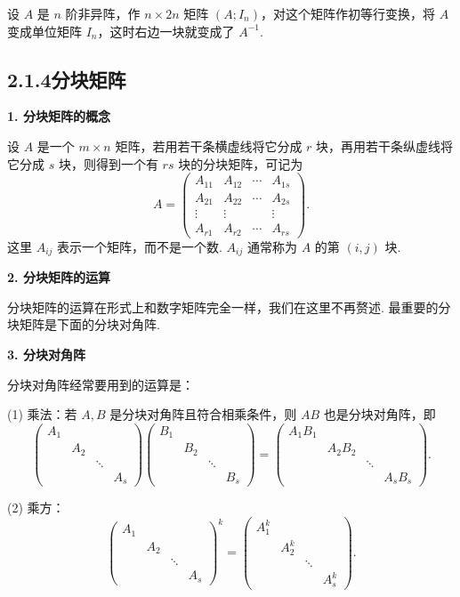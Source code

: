 \documentclass[UTF8, 12pt, fontset=fandol, oneside]{ctexart}
\begin{document}
设 $A$ 是 $n$ 阶非异阵，作 $n\times 2n$ 矩阵 $(A;I_n)$，对这个矩阵作初等行变换，将 $A$ 变成单位矩阵 $I_n$，这时右边一块就变成了 $A^{-1}$.

\subsection*{2.1.4\quad 分块矩阵}

\noindent\textbf{1. 分块矩阵的概念}

设 $A$ 是一个 $m\times n$ 矩阵，若用若干条横虚线将它分成 $r$ 块，再用若干条纵虚线将它分成 $s$ 块，则得到一个有 $rs$ 块的分块矩阵，可记为
\[
A=
\left(
\begin{array}{cccc}
A_{11} & A_{12} & \cdots & A_{1s}\\
A_{21} & A_{22} & \cdots & A_{2s}\\
\vdots & \vdots & & \vdots\\
A_{r1} & A_{r2} & \cdots & A_{rs}
\end{array}
\right).
\]
这里 $A_{ij}$ 表示一个矩阵，而不是一个数. $A_{ij}$ 通常称为 $A$ 的第 $(i,j)$ 块.

\noindent\textbf{2. 分块矩阵的运算}

分块矩阵的运算在形式上和数字矩阵完全一样，我们在这里不再赘述. 最重要的分块矩阵是下面的分块对角阵.

\noindent\textbf{3. 分块对角阵}

分块对角阵经常要用到的运算是：

(1) 乘法：若 $A,B$ 是分块对角阵且符合相乘条件，则 $AB$ 也是分块对角阵，即
\[
\left(
\begin{array}{cccc}
A_1 & & &\\
& A_2 & &\\
& & \ddots &\\
& & & A_s
\end{array}
\right)
\left(
\begin{array}{cccc}
B_1 & & &\\
& B_2 & &\\
& & \ddots &\\
& & & B_s
\end{array}
\right)
=
\left(
\begin{array}{cccc}
A_1B_1 & & &\\
& A_2B_2 & &\\
& & \ddots &\\
& & & A_sB_s
\end{array}
\right).
\]

(2) 乘方：
\[
\left(
\begin{array}{cccc}
A_1 & & &\\
& A_2 & &\\
& & \ddots &\\
& & & A_s
\end{array}
\right)^k
=
\left(
\begin{array}{cccc}
A_1^k & & &\\
& A_2^k & &\\
& & \ddots &\\
& & & A_s^k
\end{array}
\right).
\]
\end{document}
